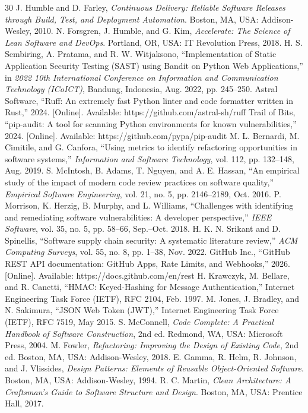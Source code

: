 \documentclass[12pt,a4paper,oneside]{report}
\begin{document}
\begin{thebibliography}{30}
 J. Humble and D. Farley, \textit{Continuous Delivery: Reliable Software Releases through Build, Test, and Deployment Automation}. Boston, MA, USA: Addison-Wesley, 2010.
 N. Forsgren, J. Humble, and G. Kim, \textit{Accelerate: The Science of Lean Software and DevOps}. Portland, OR, USA: IT Revolution Press, 2018.
 H. S. Sembiring, A. Pratama, and R. W. Witjaksono, ``Implementation of Static Application Security Testing (SAST) using Bandit on Python Web Applications,'' in \textit{2022 10th International Conference on Information and Communication Technology (ICoICT)}, Bandung, Indonesia, Aug. 2022, pp. 245--250.
 Astral Software, ``Ruff: An extremely fast Python linter and code formatter written in Rust,'' 2024. [Online]. Available: https://github.com/astral-sh/ruff
 Trail of Bits, ``pip-audit: A tool for scanning Python environments for known vulnerabilities,'' 2024. [Online]. Available: https://github.com/pypa/pip-audit
 M. L. Bernardi, M. Cimitile, and G. Canfora, ``Using metrics to identify refactoring opportunities in software systems,'' \textit{Information and Software Technology}, vol. 112, pp. 132--148, Aug. 2019.
 S. McIntosh, B. Adams, T. Nguyen, and A. E. Hassan, ``An empirical study of the impact of modern code review practices on software quality,'' \textit{Empirical Software Engineering}, vol. 21, no. 5, pp. 2146--2189, Oct. 2016.
 P. Morrison, K. Herzig, B. Murphy, and L. Williams, ``Challenges with identifying and remediating software vulnerabilities: A developer perspective,'' \textit{IEEE Software}, vol. 35, no. 5, pp. 58--66, Sep.--Oct. 2018.
 H. K. N. Srikant and D. Spinellis, ``Software supply chain security: A systematic literature review,'' \textit{ACM Computing Surveys}, vol. 55, no. 8, pp. 1--38, Nov. 2022.
 GitHub Inc., ``GitHub REST API documentation: GitHub Apps, Rate Limits, and Webhooks,'' 2026. [Online]. Available: https://docs.github.com/en/rest
 H. Krawczyk, M. Bellare, and R. Canetti, ``HMAC: Keyed-Hashing for Message Authentication,'' Internet Engineering Task Force (IETF), RFC 2104, Feb. 1997.
 M. Jones, J. Bradley, and N. Sakimura, ``JSON Web Token (JWT),'' Internet Engineering Task Force (IETF), RFC 7519, May 2015.
 S. McConnell, \textit{Code Complete: A Practical Handbook of Software Construction}, 2nd ed. Redmond, WA, USA: Microsoft Press, 2004.
 M. Fowler, \textit{Refactoring: Improving the Design of Existing Code}, 2nd ed. Boston, MA, USA: Addison-Wesley, 2018.
 E. Gamma, R. Helm, R. Johnson, and J. Vlissides, \textit{Design Patterns: Elements of Reusable Object-Oriented Software}. Boston, MA, USA: Addison-Wesley, 1994.
 R. C. Martin, \textit{Clean Architecture: A Craftsman's Guide to Software Structure and Design}. Boston, MA, USA: Prentice Hall, 2017.
\end{thebibliography}
\end{document}

